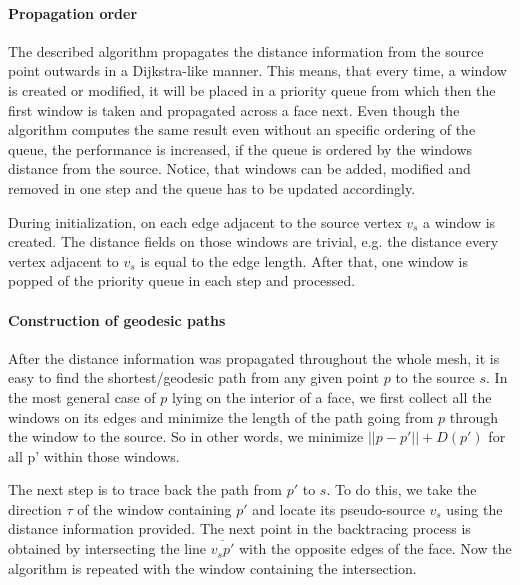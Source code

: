 \paragraph{Propagation order}
The described algorithm propagates the distance information from the source point outwards in a Dijkstra-like manner.
This means, that every time, a window is created or modified, it will be placed in a priority queue from which then the first window is taken and propagated across a face next.
Even though the algorithm computes the same result even without an specific ordering of the queue, the performance is increased, if the queue is ordered by the windows distance from the source.
Notice, that windows can be added, modified and removed in one step and the queue has to be updated accordingly.

During initialization, on each edge adjacent to the source vertex $v_s$ a window is created.
The distance fields on those windows are trivial, e.g. the distance every vertex adjacent to $v_s$ is equal to the edge length.
After that, one window is popped of the priority queue in each step and processed.

\paragraph{Construction of geodesic paths}
After the distance information was propagated throughout the whole mesh, it is easy to find the shortest/geodesic path from any given point $p$ to the source $s$.
In the most general case of $p$ lying on the interior of a face, we first collect all the windows on its edges and minimize the length of the path going from $p$ through the window to the source.
So in other words, we minimize $||p - p'|| + D(p')$ for all p' within those windows.

The next step is to trace back the path from $p'$ to $s$.
To do this, we take the direction $\tau$ of the window containing $p'$ and locate its pseudo-source $v_s$ using the distance information provided.
The next point in the backtracing process is obtained by intersecting the line $\overline{v_{s}p'}$ with the opposite edges of the face.
Now the algorithm is repeated with the window containing the intersection.

